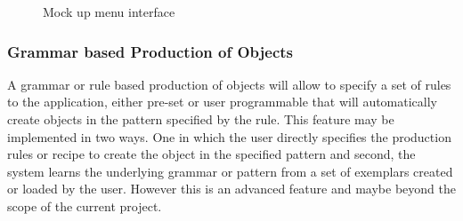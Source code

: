 \begin{figure}[hp]
	\centering
	\caption{Mock up menu interface}
	\label{fig:menu}
\end{figure}
\subsubsection{Grammar based Production of Objects}
\label{Design:Interaction:GrammarBasedProduction}
A grammar or rule based production of objects will allow to specify a set of rules to the application, either pre-set or user programmable
that will automatically create objects in the pattern specified by the rule. This feature may be implemented in two ways. One in which the user 
directly specifies the production rules or recipe to create the object in the specified pattern and second, the system learns the underlying 
grammar or pattern from a set of exemplars created or loaded by the user. However this is an advanced feature and maybe beyond the scope of the
current project.

